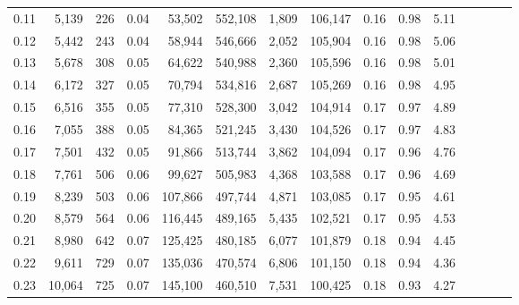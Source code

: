 \begin{tabular}{rrrcrrrrrrrrrrr}
0.11 &   5,139 &    226 &                                       0.04 &   53,502 &  552,108 &    1,809 &  106,147 &  0.16 &  0.98 &                         5.11 \\
0.12 &   5,442 &    243 &                                       0.04 &   58,944 &  546,666 &    2,052 &  105,904 &  0.16 &  0.98 &                         5.06 \\
0.13 &   5,678 &    308 &                                       0.05 &   64,622 &  540,988 &    2,360 &  105,596 &  0.16 &  0.98 &                         5.01 \\
0.14 &   6,172 &    327 &                                       0.05 &   70,794 &  534,816 &    2,687 &  105,269 &  0.16 &  0.98 &                         4.95 \\
0.15 &   6,516 &    355 &                                       0.05 &   77,310 &  528,300 &    3,042 &  104,914 &  0.17 &  0.97 &                         4.89 \\
0.16 &   7,055 &    388 &                                       0.05 &   84,365 &  521,245 &    3,430 &  104,526 &  0.17 &  0.97 &                         4.83 \\
0.17 &   7,501 &    432 &                                       0.05 &   91,866 &  513,744 &    3,862 &  104,094 &  0.17 &  0.96 &                         4.76 \\
0.18 &   7,761 &    506 &                                       0.06 &   99,627 &  505,983 &    4,368 &  103,588 &  0.17 &  0.96 &                         4.69 \\
0.19 &   8,239 &    503 &                                       0.06 &  107,866 &  497,744 &    4,871 &  103,085 &  0.17 &  0.95 &                         4.61 \\
0.20 &   8,579 &    564 &                                       0.06 &  116,445 &  489,165 &    5,435 &  102,521 &  0.17 &  0.95 &                         4.53 \\
0.21 &   8,980 &    642 &                                       0.07 &  125,425 &  480,185 &    6,077 &  101,879 &  0.18 &  0.94 &                         4.45 \\
0.22 &   9,611 &    729 &                                       0.07 &  135,036 &  470,574 &    6,806 &  101,150 &  0.18 &  0.94 &                         4.36 \\
0.23 &  10,064 &    725 &                                       0.07 &  145,100 &  460,510 &    7,531 &  100,425 &  0.18 &  0.93 &                         4.27 \\

\end{tabular}
